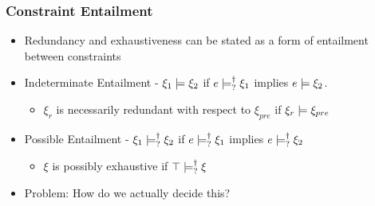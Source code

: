 \documentclass{beamer}
\begin{document}
\begin{frame}
\frametitle{Constraint Entailment}
\begin{itemize}
\item Redundancy and exhaustiveness can be stated as a form of entailment between constraints
\medskip
\item Indeterminate Entailment - $\xi_1 \models \xi_2$ if $e \models_{?}^{\dag} \xi_1$ implies $e \models \xi_2$.
\smallskip
\begin{itemize}
	\item $\xi_r$ is necessarily redundant with respect to $\xi_{pre}$ if $\xi_r \models \xi_{pre}$
\end{itemize}
\medskip
\item Possible Entailment - $\xi_1 \models_{?}^{\dag} \xi_2$ if $e \models_{?}^{\dag} \xi_1$ implies $e \models_{?}^{\dag} \xi_2$
\smallskip
\begin{itemize}
\item $\xi$ is possibly exhaustive if $\top \models_{?}^{\dag} \xi$
\end{itemize}
\medskip
\item Problem: How do we actually decide this?
\end{itemize}
\end{frame}
\end{document}
